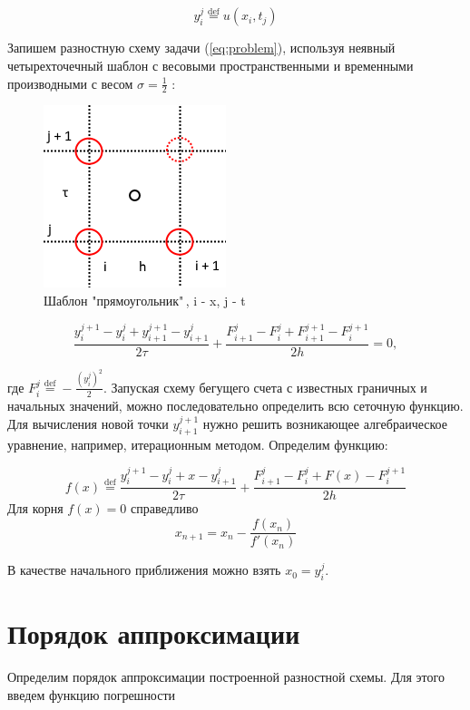 \documentclass[12pt]{article}
\begin{document}
		$$y_i^j \overset{\mathrm{def}}{=} u(x_i, t_j)$$
		
		Запишем разностную схему задачи (\ref{eq:problem}), используя неявный четырехточечный шаблон с весовыми пространственными и временными производными с весом $\sigma = \frac{1}{2}$ :
		
		\begin{figure}[h!]
			\begin{center}
				\includegraphics[width=0.5\linewidth]{template}
				\caption{Шаблон "прямоугольник"\,, i - x, j - t}
			\end{center}
		\end{figure}
		
		\begin{equation}
			\frac{y^{j+1}_i - y^j_i + y^{j+1}_{i+1} - y^j_{i+1}}{2\tau} + \frac{F^j_{i+1} - F^j_i + F^{j+1}_{i+1} - F^{j+1}_i}{2h} = 0,
		\end{equation}
		
		где $F^j_i \overset{\mathrm{def}}{=} -\frac{(y^j_i)^2}{2}$. Запуская схему бегущего счета с известных граничных и начальных значений, можно последовательно определить всю сеточную функцию. Для вычисления новой точки $y^{j+1}_{i+1}$ нужно решить возникающее алгебраическое уравнение, например, итерационным методом. Определим функцию:
		
		$$ f(x) \overset{\mathrm{def}}{=} \frac{y^{j+1}_i - y^j_i + x - y^j_{i+1}}{2\tau} + \frac{F^j_{i+1} - F^j_i + F(x) - F^{j+1}_i}{2h}$$
		Для корня $f(x) = 0$ справедливо
		$$x_{n+1} = x_n - \frac{f(x_n)}{f'(x_n)}$$
		
		В качестве начального приближения можно взять $x_0 = y_i^j$.
		
	\section{Порядок аппроксимации}
		Определим порядок аппроксимации построенной разностной схемы. Для этого введем функцию погрешности
		
\end{document}
